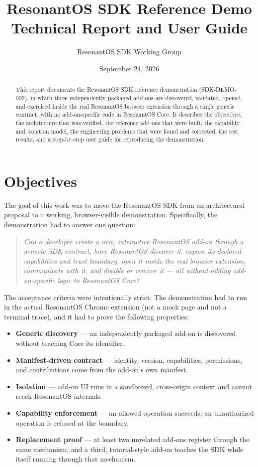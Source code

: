 \documentclass[11pt]{article}
\title{
  \vspace{-2em}
  \textbf{ResonantOS SDK Reference Demo}\\[0.4em]
  \large Technical Report and User Guide
}
\author{ResonantOS SDK Working Group}
\date{September 24, 2026}
\begin{document}
\maketitle

\begin{abstract}
This report documents the ResonantOS SDK reference demonstration
(\textsc{SDK-DEMO-002}), in which three independently packaged add-ons are
discovered, validated, opened, and exercised inside the real ResonantOS browser
extension through a single generic contract, with no add-on-specific code in
ResonantOS Core. It describes the objectives, the architecture that was
verified, the reference add-ons that were built, the capability and isolation
model, the engineering problems that were found and corrected, the test
results, and a step-by-step user guide for reproducing the demonstration.
\end{abstract}

\tableofcontents

\section{Objectives}

The goal of this work was to move the ResonantOS SDK from an architectural
proposal to a working, browser-visible demonstration. Specifically, the
demonstration had to answer one question:

\begin{quote}
\itshape
Can a developer create a new, interactive ResonantOS add-on through a generic
SDK contract, have ResonantOS discover it, expose its declared capabilities and
trust boundary, open it inside the real browser extension, communicate with it,
and disable or remove it --- all without adding add-on-specific logic to
ResonantOS Core?
\end{quote}

The acceptance criteria were intentionally strict. The demonstration had to
run in the actual ResonantOS Chrome extension (not a mock page and not a
terminal trace), and it had to prove the following properties:

\begin{itemize}[leftmargin=1.5em]
  \item \textbf{Generic discovery} --- an independently packaged add-on is
        discovered without teaching Core its identifier.
  \item \textbf{Manifest-driven contract} --- identity, version, capabilities,
        permissions, and contributions come from the add-on's own manifest.
  \item \textbf{Isolation} --- add-on UI runs in a sandboxed, cross-origin
        context and cannot reach ResonantOS internals.
  \item \textbf{Capability enforcement} --- an allowed operation succeeds; an
        unauthorized operation is refused at the boundary.
  \item \textbf{Replacement proof} --- at least two unrelated add-ons register
        through the same mechanism, and a third, tutorial-style add-on teaches
        the SDK while itself running through that mechanism.
\end{itemize}
\end{document}
